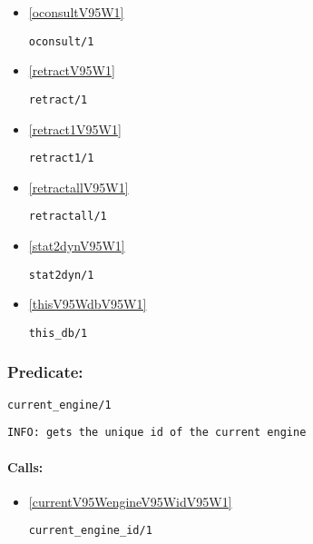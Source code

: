 \begin{itemize}
\item \ref{oconsultV95W1} 
\begin{verbatim}
oconsult/1
\end{verbatim}

\item \ref{retractV95W1} 
\begin{verbatim}
retract/1
\end{verbatim}

\item \ref{retract1V95W1} 
\begin{verbatim}
retract1/1
\end{verbatim}

\item \ref{retractallV95W1} 
\begin{verbatim}
retractall/1
\end{verbatim}

\item \ref{stat2dynV95W1} 
\begin{verbatim}
stat2dyn/1
\end{verbatim}

\item \ref{thisV95WdbV95W1} 
\begin{verbatim}
this_db/1
\end{verbatim}

\end{itemize}

\subsubsection{Predicate:} \label{currentV95WengineV95W1}

\begin{verbatim}
current_engine/1
\end{verbatim}

{\small \begin{verbatim}
INFO: gets the unique id of the current engine

\end{verbatim}}
\paragraph{Calls:} 
\begin{itemize}
\item \ref{currentV95WengineV95WidV95W1} 
\begin{verbatim}
current_engine_id/1
\end{verbatim}

\end{itemize}

